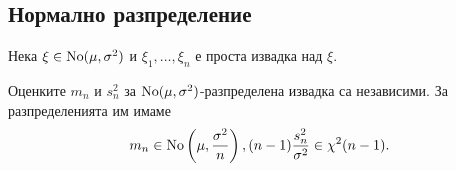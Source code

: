 \documentclass[
  numbers=endperiod,
  headings=standardclasses,
  bibliography=totocnumbered,
]{scrartcl}
\begin{document}
\subsection{Нормално разпределение}

Нека \( \xi \in \operatorname{No}(\mu, \sigma^2) \) и \( \xi_1, \ldots, \xi_n \) е проста извадка над \( \xi \).

\begin{proposition}\label{thm:normal_mean_variance_estimators_independent}
  Оценките \( m_n \) и \( s_n^2 \) за \( \operatorname{No}(\mu, \sigma^2) \)-разпределена извадка са независими. За разпределенията им имаме
  \begin{equation*}
    m_n \in \operatorname{No} \left(\mu, \frac {\sigma^2} n \right),
    \\
    (n-1) \frac {s_n^2} {\sigma^2} \in \chi^2(n-1).
  \end{equation*}
\end{proposition}
\end{document}
